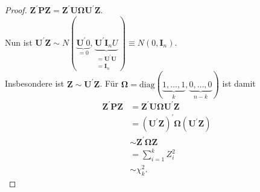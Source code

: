 \documentclass{tstextbook}
\begin{document}
\begin{proof}
	$ \mathbf{Z}^\prime \mathbf{P}\mathbf{Z} = \mathbf{Z}^\prime \mathbf{U} \mathbf{\Omega} \mathbf{U}^\prime \mathbf{Z} $. \\
	Nun ist  $ \mathbf{U}^\prime \mathbf{Z} \sim N(\underbrace{\mathbf{U}^\prime 0}_{=0}, \underbrace{\mathbf{U}^\prime \mathbf{I}_n U}_{\substack{= \mathbf{U}^\prime \mathbf{U} \\ = \mathbf{I}_n}}) \equiv N(0, \mathbf{I}_n) $. \\
	
	Insbesondere ist $ \mathbf{Z} \sim \mathbf{U}^\prime \mathbf{Z} $. Für $ \mathbf{\Omega} = \text{diag}(\underbrace{1, \ldots, 1}_k, \underbrace{0, \ldots, 0}_{n-k}) $ ist damit 
	\[
	\begin{aligned}
		\mathbf{Z}^\prime \mathbf{P} \mathbf{Z} & = \mathbf{Z}^\prime \mathbf{U} \mathbf{\Omega} \mathbf{U}^\prime \mathbf{Z} \\
		& = (\mathbf{U}^\prime \mathbf{Z})^\prime \mathbf{\Omega} (\mathbf{U}^\prime \mathbf{Z}) \\
		& \sim \mathbf{Z}^\prime \mathbf{\Omega} \mathbf{Z} \\
		& = \sum_{i=1}^{k} Z_i^2 \\
		& \sim \chi_k^2.
	\end{aligned}
	\]
\end{proof}
\end{document}
